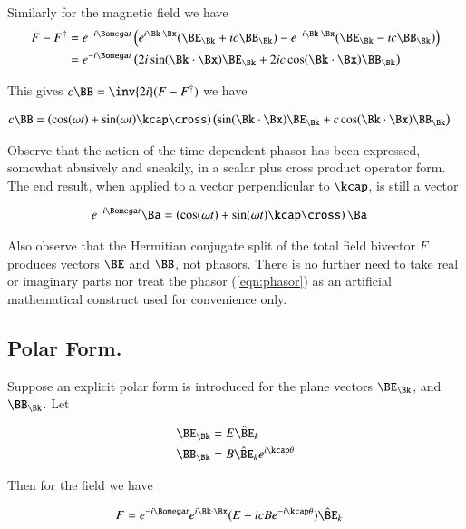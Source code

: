 Similarly for the magnetic field we have
\begin{align*}
F - F^\dagger
&=
e^{-i\Bomega t} \left(
 e^{i \Bk \cdot \Bx} (\BE_\Bk + i c \BB_\Bk)
-e^{-i \Bk \cdot \Bx} (\BE_\Bk - i c \BB_\Bk)
\right) \\
&=
e^{-i\Bomega t} \left(
 2 i \sin(\Bk \cdot \Bx) \BE_\Bk
+ 2 i c \cos(\Bk \cdot \Bx) \BB_\Bk
\right) \\
\end{align*}

This gives $c \BB = \inv{2i}(F - F^\dagger)$ we have

\begin{align}\label{eqn:magneticSplit}
c \BB &=
\left( \cos(\omega t) + \sin(\omega t) \kcap \cross \right)
\left(
 \sin(\Bk \cdot \Bx) \BE_\Bk
+ c \cos(\Bk \cdot \Bx) \BB_\Bk
\right)
\end{align}

Observe that the action of the time dependent phasor has been expressed, somewhat abusively and sneakily, in a scalar plus cross product operator form.  The end result, when applied to a vector perpendicular to $\kcap$, is still a vector

\begin{align*}
e^{-i\Bomega t} \Ba
&=
\left( \cos(\omega t) + \sin(\omega t) \kcap \cross \right) \Ba
\end{align*}

Also observe that the Hermitian conjugate split of the total field bivector $F$ produces vectors $\BE$ and $\BB$, not phasors.  There is no further need to take real or imaginary parts nor treat the phasor (\ref{eqn:phasor}) as an artificial mathematical construct used for convenience only.

\subsection{Polar Form.}

Suppose an explicit polar form is introduced for the plane vectors $\BE_\Bk$, and $\BB_\Bk$.  Let

\begin{align*}
\BE_\Bk &= E {\hat{\BE}_k} \\
\BB_\Bk &= B {\hat{\BE}_k} e^{i\kcap \theta}
\end{align*}

Then for the field we have

\begin{align}\label{eqn:phasorPolar}
F &= e^{-i\Bomega t} e^{i \Bk \cdot \Bx} (E + i c B e^{-i\kcap \theta}) \hat{\BE}_k
\end{align}

